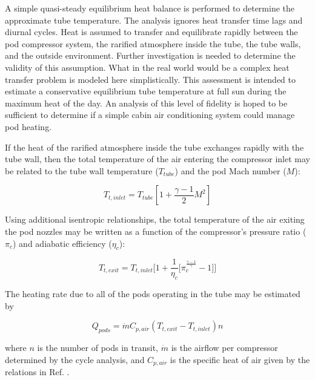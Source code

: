 \documentclass[heading.tex]{subfiles}
\begin{document}
A simple quasi-steady equilibrium heat balance
is performed to determine the approximate tube temperature.
The analysis ignores heat transfer time lags and diurnal cycles.
Heat is assumed to transfer and equilibrate rapidly between the pod compressor system,
the rarified atmosphere inside the tube, the tube walls, and the outside environment.
Further investigation is needed to determine the validity of this assumption.
What in the real world would be a complex heat transfer problem
is modeled here simplistically.
This assessment is intended to estimate a conservative
equilibrium tube temperature at full sun during the maximum heat of the day.
An analysis of this level of fidelity is hoped to be sufficient to determine if a
simple cabin air conditioning system could manage pod heating.

If the heat of the rarified atmosphere inside the tube exchanges rapidly with the tube wall,
then the total temperature of the air entering the compressor inlet
may be related to the tube wall temperature ($T_{tube}$) and the pod Mach number ($M$):

\begin{equation}
T_{t,inlet} = T_{tube} [1 + \frac{\gamma -1}{2} M^2]
\end{equation}

Using additional isentropic relationships,
the total temperature of the air exiting the pod nozzles may be written as a function
of the compressor's pressure ratio ($\pi_{c}$) and adiabatic efficiency ($\eta_{c}$):

\begin{equation}
T_{t,exit} = T_{t,inlet} \Bigg[ 1 + \frac{1}{\eta_{c}} \Big[ \pi_{c}^{\frac{\gamma-1}{\gamma}}- 1 \Big] \Bigg]
\end{equation}

The heating rate due to all of the pods operating in the tube may be estimated by

\begin{equation}
{Q}_{pods}= \dot{m} C_{p,air} (T_{t,exit} - T_{t,inlet}) n
\end{equation}

where $n$ is the number of pods in transit,
$\dot{m}$ is the airflow per compressor determined by the cycle analysis,
and $C_{p,air}$ is the specific heat of air given by the relations in Ref. . 
\end{document}
